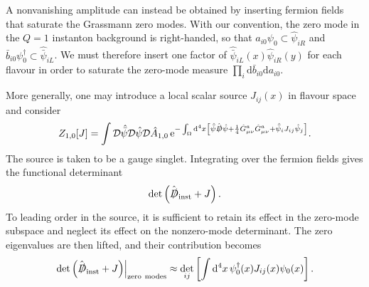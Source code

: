 \documentclass[review]{elsarticle}
\numberwithin{equation}{section}
\numberwithin{table}{section}
\numberwithin{figure}{section}
\def\d{\mathrm{d}}
\def\e{\mathrm{e}}
\begin{document}
A nonvanishing amplitude can instead be obtained by inserting fermion fields that saturate the Grassmann zero modes. With our convention, the zero mode in the $Q=1$ instanton background is right-handed, so that $a_{i0}\psi_0\subset\hat\psi_{iR}$ and $\bar b_{i0}\psi_0^\dagger\subset\hat{\bar\psi}_{iL}$. We must therefore insert one factor of $\hat{\bar\psi}_{iL}(x)\hat\psi_{iR}(y)$ for each flavour in order to saturate the zero-mode measure $\prod_i\d\bar b_{i0}\d a_{i0}$.

More generally, one may introduce a local scalar source $J_{ij}(x)$ in flavour space and consider
\begin{align}
    Z_{1,0}[J] = \int\mathcal{D}\hat{\bar\psi}\mathcal{D}\hat\psi\mathcal{D}\hat A_{1,0}\,
    \e^{-\int_\Omega \d^4x\left[\hat{\bar\psi}\hat{\slashed{D}}\hat\psi+\frac{1}{4}\hat G_{\mu\nu}^a\hat G_{\mu\nu}^a+\hat{\bar\psi}_i J_{ij}\hat\psi_j\right]}.\label{eq:one_instanton_amplitude_source}
\end{align}
The source is taken to be a gauge singlet. Integrating over the fermion fields gives the functional determinant
\begin{equation}
\det\left(\hat{\slashed{D}}_{\rm inst}+J\right).
\end{equation}
To leading order in the source, it is sufficient to retain its effect in the zero-mode subspace and neglect its effect on the nonzero-mode determinant. The zero eigenvalues are then lifted, and their contribution becomes
\begin{equation}
\left.\det\left(\hat{\slashed{D}}_{\rm inst}+J\right)\right|_{\rm zero\ modes}\approx\det_{ij}\left[\int \d^4x\,\psi_0^\dagger(x)J_{ij}(x)\psi_0(x)\right].
\label{eq:thooft_source_determinant}
\end{equation}
\end{document}
